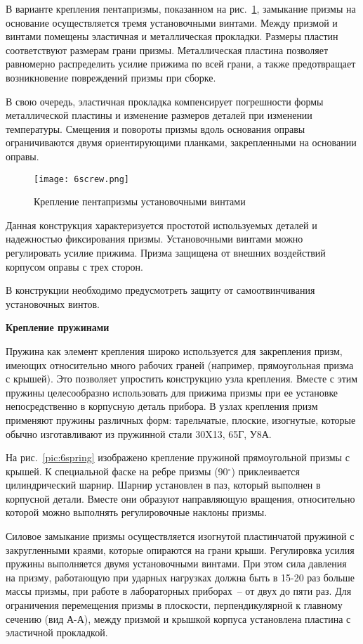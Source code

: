 В варианте крепления пентапризмы, показанном на рис.~\ref{pic:6screw}, замыкание призмы на основание осуществляется тремя установочными винтами. Между призмой и винтами помещены эластичная и металлическая прокладки. Размеры пластин соответствуют размерам грани призмы. Металлическая пластина позволяет равномерно распределить усилие прижима по всей грани, а также предотвращает возникновение повреждений призмы при сборке. 

В свою очередь, эластичная прокладка компенсирует погрешности формы металлической пластины и изменение размеров деталей при изменении температуры. Смещения и повороты призмы вдоль основания оправы ограничиваются двумя ориентирующими планками, закрепленными на основании оправы.

\begin{figure}[h!]
	\caption{ Крепление пентапризмы установочными винтами }
	\texttt{[image: 6screw.png]}
	\label{pic:6screw}
\end{figure}

Данная конструкция характеризуется простотой используемых деталей и надежностью фиксирования призмы. Установочными винтами можно регулировать усилие прижима. Призма защищена от внешних воздействий корпусом оправы с трех сторон.

В конструкции необходимо предусмотреть защиту от самоотвинчивания установочных винтов.

\begin{flushleft}
	\textbf{Крепление пружинами}
\end{flushleft}

Пружина как элемент крепления широко используется для закрепления призм, имеющих относительно много рабочих граней (например, прямоугольная призма с крышей). Это позволяет упростить конструкцию узла крепления. Вместе с этим пружины целесообразно использовать для прижима призмы при ее установке непосредственно в корпусную деталь прибора. В узлах крепления призм применяют пружины различных форм: тарельчатые, плоские, изогнутые, которые обычно изготавливают из пружинной стали 30X13, 65Г, У8А.

На рис.~\ref{pic:6spring} изображено крепление пружиной прямоугольной призмы с крышей. К специальной фаске на ребре призмы (90$ ^\circ $) приклеивается цилиндрический шарнир. Шарнир установлен в паз, который выполнен в корпусной детали. Вместе они образуют направляющую вращения, относительно которой можно выполнять регулировочные наклоны призмы.

Силовое замыкание призмы осуществляется изогнутой пластинчатой пружиной с закругленными краями, которые опираются на грани крыши. Регулировка усилия пружины выполняется двумя установочными винтами. При этом сила давления на призму, работающую при ударных нагрузках должна быть в 15-20 раз больше массы призмы, при работе в лабораторных приборах~-- от двух до пяти раз. Для ограничения перемещения призмы в плоскости, перпендикулярной к главному сечению (вид А-А), между призмой и крышкой корпуса установлена пластина с эластичной прокладкой.

